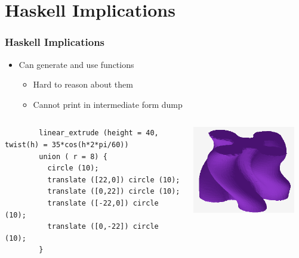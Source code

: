 \documentclass{beamer}
\begin{document}
\section{Haskell Implications}

\begin{frame}[fragile]
  \frametitle{Haskell Implications}
  \begin{itemize}
  \item Can generate and use functions
    \begin{itemize}
    \item Hard to reason about them
    \item Cannot print in intermediate form dump
    \end{itemize}
  \end{itemize}
  \begin{columns}
    \begin{column}{0.7\textwidth}
      \lstset{basicstyle=\ttfamily\scriptsize}
      \begin{lstlisting}
        linear_extrude (height = 40, twist(h) = 35*cos(h*2*pi/60))
        union ( r = 8) {
          circle (10);
          translate ([22,0]) circle (10);
          translate ([0,22]) circle (10);
          translate ([-22,0]) circle (10);
          translate ([0,-22]) circle (10);
        }
      \end{lstlisting}
    \end{column}
    \begin{column}{0.2\textwidth}
      \includegraphics[width=0.9\textwidth, right]{website-example_object.png}
    \end{column}
  \end{columns}
\end{frame}
\end{document}
